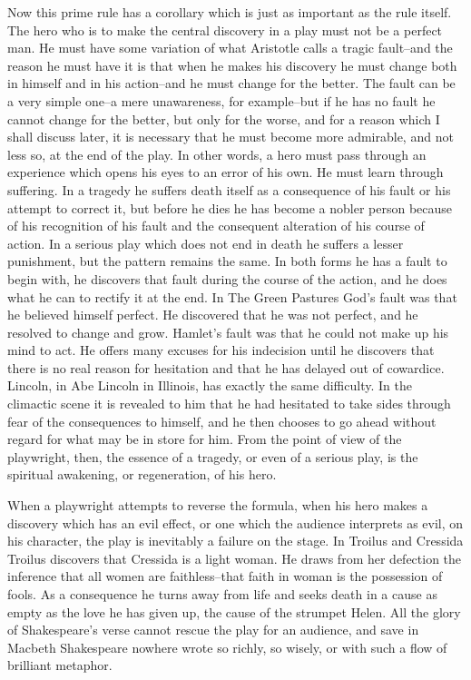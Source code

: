 \documentclass[9pt,twoside]{extarticle}
\begin{document}
Now this prime rule has a corollary which is just as important as the rule itself. The hero who is to make the central discovery in a play must not be a perfect man. He must have some variation of what Aristotle calls a tragic fault--and the reason he must have it is that when he makes his discovery he must change both in himself and in his action--and he must change for the better. The fault can be a very simple one--a mere unawareness, for example--but if he has no fault he cannot change for the better, but only for the worse, and for a reason which I shall discuss later, it is necessary that he must become more admirable, and not less so, at the end of the play. In other words, a hero must pass through an experience which opens his eyes to an error of his own. He must learn through suffering. In a tragedy he suffers death itself as a consequence of his fault or his attempt to correct it, but before he dies he has become a nobler person because of his recognition of his fault and the consequent alteration of his course of action. In a serious play which does not end in death he suffers a lesser punishment, but the pattern remains the same. In both forms he has a fault to begin with, he discovers that fault during the course of the action, and he does what he can to rectify it at the end. In The Green Pastures God's fault was that he believed himself perfect. He discovered that he was not perfect, and he resolved to change and grow. Hamlet's fault was that he could not make up his mind to act. He offers many excuses for his indecision until he discovers that there is no real reason for hesitation and that he has delayed out of cowardice. Lincoln, in Abe Lincoln in Illinois, has exactly the same difficulty. In the climactic scene it is revealed to him that he had hesitated to take sides through fear of the consequences to himself, and he then chooses to go ahead without regard for what may be in store for him. From the point of view of the playwright, then, the essence of a tragedy, or even of a serious play, is the spiritual awakening, or regeneration, of his hero.

When a playwright attempts to reverse the formula, when his hero makes a discovery which has an evil effect, or one which the audience interprets as evil, on his character, the play is inevitably a failure on the stage. In Troilus and Cressida Troilus discovers that Cressida is a light woman. He draws from her defection the inference that all women are faithless--that faith in woman is the possession of fools. As a consequence he turns away from life and seeks death in a cause as empty as the love he has given up, the cause of the strumpet Helen. All the glory of Shakespeare's verse cannot rescue the play for an audience, and save in Macbeth Shakespeare nowhere wrote so richly, so wisely, or with such a flow of brilliant metaphor.
\end{document}
